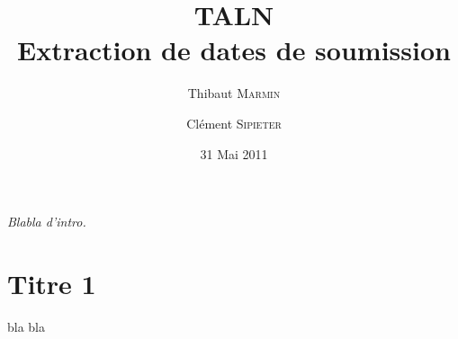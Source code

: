 \documentclass[a4paper,french,10pt]{article}
\title{\textbf{TALN\\ Extraction de dates de soumission}}
\author{Thibaut \textsc{Marmin} \and Clément \textsc{Sipieter}}
\date{31 Mai 2011}
\begin{document}
\maketitle

\emph{Blabla d'intro.}

\section{Titre 1}

bla bla 
\end{document}
